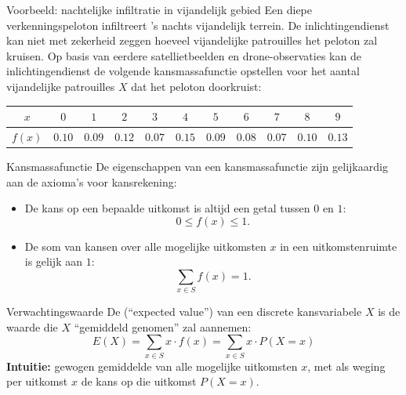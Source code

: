 \begin{frame}{Voorbeeld: nachtelijke infiltratie in vijandelijk gebied}
    Een diepe verkenningspeloton infiltreert 's nachts vijandelijk terrein.
    De inlichtingendienst kan niet met zekerheid zeggen hoeveel vijandelijke patrouilles het peloton zal kruisen.
    \vfill
    Op basis van eerdere satellietbeelden en drone-observaties kan de inlichtingendienst de volgende kansmassafunctie opstellen voor het aantal vijandelijke patrouilles $X$ dat het peloton doorkruist:
    \vfill
   {\small
        \begin{center}
            \begin{tabular}{*{11}{c}}
                \toprule
                    $x$     & $0$ & $1$ & $2$ & $3$ & $4$ & $5$ & $6$ & $7$ & $8$ & $9$ \\
                \midrule    
                    $f(x)$  & $0.10$ & $0.09$ & $0.12$ & $0.07$ & $0.15$ & $0.09$ & $0.08$ & $0.07$ & $0.10$ & $0.13$ \\
                \bottomrule
            \end{tabular}
        \end{center}
    }
\end{frame}

\begin{frame}{Kansmassafunctie}
    De eigenschappen van een kansmassafunctie zijn gelijkaardig aan de axioma's voor kansrekening:
    \vfill
    \begin{itemize}
        \item De kans op een bepaalde uitkomst is altijd een getal tussen $0$ en $1$:
        \[
            0 \leq f(x) \leq 1.
        \]
        \item De som van kansen over alle mogelijke uitkomsten $x$ in een uitkomstenruimte is gelijk aan $1$:
        \[
            \sum_{x \in S} f(x) = 1.
        \]
    \end{itemize}
\end{frame}

\begin{frame}{Verwachtingswaarde}
    De  (\enquote{expected value}) van een discrete kansvariabele $X$ is de waarde die $X$ \enquote{gemiddeld genomen} zal aannemen:
    \[
        E(X) = \sum_{x \in S} x \cdot f(x) = \sum_{x \in S} x \cdot P(X = x)
    \]
    \vfill
    \textbf{Intuitie: } gewogen gemiddelde van alle mogelijke uitkomsten $x$, met als weging per uitkomst $x$ de kans op die uitkomst $P(X=x)$.
\end{frame}


